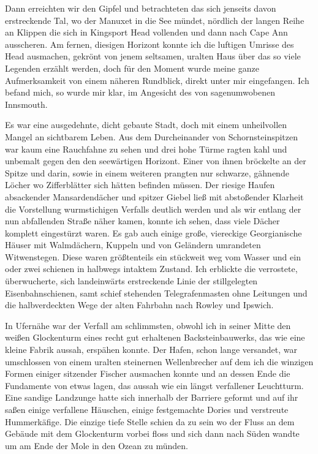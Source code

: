 Dann erreichten wir den Gipfel und betrachteten das sich jenseits davon erstreckende Tal, wo der Manuxet in die See mündet, nördlich der langen Reihe an Klippen die sich in Kingsport Head vollenden und dann nach Cape Ann ausscheren. Am fernen, diesigen Horizont konnte ich die luftigen Umrisse des Head ausmachen, gekrönt von jenem seltsamen, uralten Haus über das so viele Legenden erzählt werden, doch für den Moment wurde meine ganze Aufmerksamkeit von einem näheren Rundblick, direkt unter mir eingefangen. Ich befand mich, so wurde mir klar, im Angesicht des von sagenumwobenen Innsmouth.

Es war eine ausgedehnte, dicht gebaute Stadt, doch mit einem unheilvollen Mangel an sichtbarem Leben. Aus dem Durcheinander von Schornsteinspitzen war kaum eine Rauchfahne zu sehen und drei hohe Türme ragten kahl und unbemalt gegen den den seewärtigen Horizont. Einer von ihnen bröckelte an der Spitze und darin, sowie in einem weiteren prangten nur schwarze, gähnende Löcher wo Zifferblätter sich hätten befinden müssen. Der riesige Haufen absackender Mansardendächer und spitzer Giebel ließ mit abstoßender Klarheit die Vorstellung wurmstichigen Verfalls deutlich werden und als wir entlang der nun abfallenden Straße näher kamen, konnte ich sehen, dass viele Dächer komplett eingestürzt waren. Es gab auch einige große, viereckige Georgianische Häuser mit Walmdächern, Kuppeln und von Geländern umrandeten Witwenstegen. Diese waren größtenteils ein stückweit weg vom Wasser und ein oder zwei schienen in halbwegs intaktem Zustand. Ich erblickte die verrostete, überwucherte, sich landeinwärts erstreckende Linie der stillgelegten Eisenbahnschienen, samt schief stehenden Telegrafenmasten ohne Leitungen und die halbverdeckten Wege der alten Fahrbahn nach Rowley und Ipswich.

In Ufernähe war der Verfall am schlimmsten, obwohl ich in seiner Mitte den weißen Glockenturm eines recht gut erhaltenen Backsteinbauwerks, das wie eine kleine Fabrik aussah, erspähen konnte. Der Hafen, schon lange versandet, war umschlossen von einem uralten steinernen Wellenbrecher auf dem ich die winzigen Formen einiger sitzender Fischer ausmachen konnte und an dessen Ende die Fundamente von etwas lagen, das aussah wie ein längst verfallener Leuchtturm. Eine sandige Landzunge hatte sich innerhalb der Barriere geformt und auf ihr saßen einige verfallene Häuschen, einige festgemachte Dories und verstreute Hummerkäfige. Die einzige tiefe Stelle schien da zu sein wo der Fluss an dem Gebäude mit dem Glockenturm vorbei floss und sich dann nach Süden wandte um am Ende der Mole in den Ozean zu münden.

